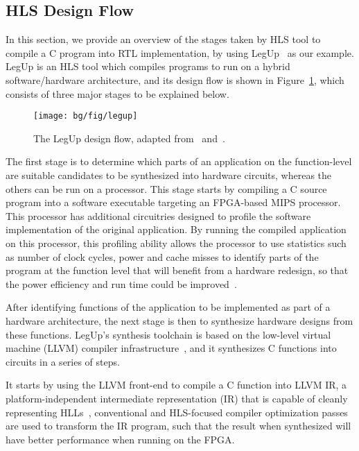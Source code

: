 \subsection{HLS Design Flow}
\label{bg:sub:hls_design}

In this section, we provide an overview of the stages taken by HLS tool to
compile a C program into RTL implementation, by using LegUp~\cite{legup,
canis13} as our example.  LegUp is an HLS tool which compiles programs to run
on a hybrid software/hardware architecture, and its design flow is shown in
Figure~\ref{bg:fig:legup}, which consists of three major stages to be explained
below.
\begin{figure}[ht]
    \centering
    \texttt{[image: bg/fig/legup]}
    \caption{%
        The LegUp design flow, adapted from~\cite{canis13} and~\cite{legup}.
    }\label{bg:fig:legup}
\end{figure}

The first stage is to determine which parts of an application on the
function-level are suitable candidates to be synthesized into hardware
circuits, whereas the others can be run on a processor.  This stage starts by
compiling a C source program into a software executable targeting an FPGA-based
MIPS processor.  This processor has additional circuitries designed to profile
the software implementation of the original application.  By running the
compiled application on this processor, this profiling ability allows the
processor to use statistics such as number of clock cycles, power and cache
misses to identify parts of the program at the function level that will benefit
from a hardware redesign, so that the power efficiency and run time could be
improved~\cite{canis13}.

After identifying functions of the application to be implemented as part
of a hardware architecture, the next stage is then to synthesize hardware
designs from these functions.  LegUp's synthesis toolchain is based on the
low-level virtual machine (LLVM) compiler infrastructure~\cite{llvm}, and it
synthesizes C functions into circuits in a series of steps.

It starts by using the LLVM front-end to compile a C function into LLVM IR,
a platform-independent intermediate representation (IR) that is capable of
cleanly representing HLLs~\cite{llvm_ir}, conventional and HLS-focused compiler
optimization passes are used to transform the IR program, such that the result
when synthesized will have better performance when running on the FPGA\@.

